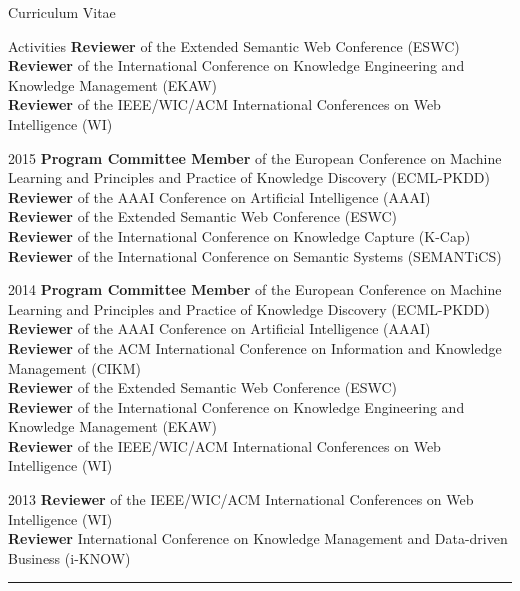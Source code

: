 \begin{cv}{\centerline{\LARGE Curriculum Vitae}}
\begin{cvlist}{Activities}
  \textbf{Reviewer} of the Extended Semantic Web Conference (ESWC) \\ 
  \textbf{Reviewer} of the International Conference on Knowledge Engineering and Knowledge Management (EKAW) \\
  \textbf{Reviewer} of the IEEE/WIC/ACM International Conferences on Web Intelligence (WI)
  \item[2015]  \textbf{Program Committee Member} of the European Conference on Machine Learning and Principles and Practice of Knowledge Discovery (ECML-PKDD) \\
  \textbf{Reviewer} of the AAAI Conference on Artificial Intelligence (AAAI) \\
  \textbf{Reviewer} of the Extended Semantic Web Conference (ESWC) \\ 
  \textbf{Reviewer} of the International Conference on Knowledge Capture (K-Cap) \\
  \textbf{Reviewer} of the International Conference on Semantic Systems (SEMANTiCS)
\item[2014]  \textbf{Program Committee Member} of the European Conference on Machine Learning and Principles and Practice of Knowledge Discovery (ECML-PKDD) \\
  \textbf{Reviewer} of the AAAI Conference on Artificial Intelligence (AAAI) \\
  \textbf{Reviewer} of the ACM International Conference on Information and Knowledge Management (CIKM) \\
  \textbf{Reviewer} of the Extended Semantic Web Conference (ESWC) \\ 
  \textbf{Reviewer} of the International Conference on Knowledge Engineering and Knowledge Management (EKAW) \\
  \textbf{Reviewer} of the IEEE/WIC/ACM International Conferences on Web Intelligence (WI)
\item[2013]  \textbf{Reviewer} of the IEEE/WIC/ACM International Conferences on Web Intelligence (WI) \\
  \textbf{Reviewer} International Conference on Knowledge Management and Data-driven Business (i-KNOW)
  \end{cvlist}

  \hrule
  

\end{cv}
